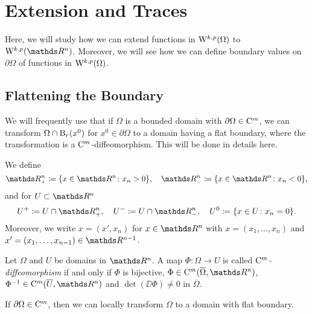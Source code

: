 \chapter{Extension and Traces}
\label{chap:extAndTrace}

Here, we will study how we can extend functions in $\mathrm{W}^{k,p}(\Omega)$ to $\WW^{k,p}(\R^n)$.
Moreover, we will see how we can define boundary values on $\partial\Omega$ of functions in $\mathrm{W}^{k,p}(\Omega)$.

\section{Flattening the Boundary}

We will frequently use that if $\Omega$ is a bounded domain with $\partial\Omega \in \mathrm{C}^m$, we can transform $\Omega \cap \mathrm{B}_r(x^0)$ for $x^0 \in \partial\Omega$ to a domain having a flat boundary, where the transformation is a $\mathrm{C}^m$\hyp{}diffeomorphism.
This will be done in details here.

\begin{ntion}
  \label{ntion:halfspace}
  We define 
  $$
  \R^n_+ \coloneqq \{x \in \R^n \colon x_n > 0 \}, \quad \R^n_-\coloneqq \{x \in \R^n \colon x_n < 0\},
  $$
  and for $U \subset \R^n$
  $$
  U^+ \coloneqq U \cap \R^n_+, \quad U^- \coloneqq U \cap \R^n_-, \quad U^0 \coloneqq \{x \in U \colon x_n = 0\}.
  $$
  Moreover, we write $x = (x', x_n)$ for $x \in \R^n$ with $x = (x_1,\dots,x_n)$ and $x' =(x_1, \dots, x_{n - 1}) \in \R^{n - 1}$.
\end{ntion}

\begin{defn}
  \label{defn:CmDiffeo}
  Let $\Omega$ and $U$ be domains in $\R^n$.
  A map $\Phi \colon \Omega \to U$ is called \emph{$\mathrm{C}^m$\hyp{}diffeomorphism} if and only if $\Phi$ is bijective, $\Phi \in \CC^m(\overline{\Omega},\R^n)$, $\Phi^{-1} \in \CC^m(\overline U, \R^n)$ and $\det(\DD \Phi) \neq 0$ in $\overline \Omega$.
\end{defn}

If $\partial \Omega \in \mathrm{C}^m$, then we can locally transform $\Omega$ to a domain with flat boundary.

